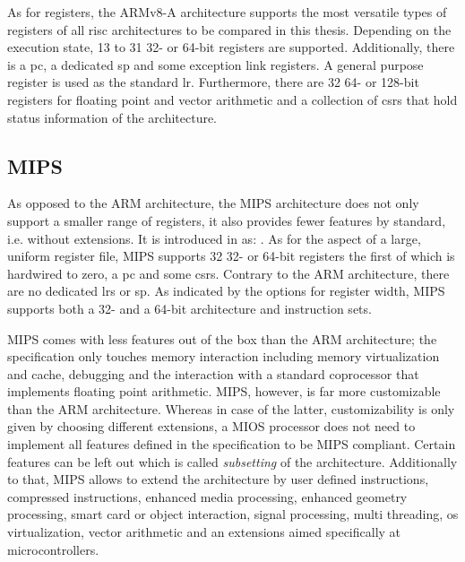 As for registers, the ARMv8-A architecture supports the most versatile types of registers of all \gls{risc} architectures to be compared in this thesis.
Depending on the execution state, 13 to 31 32- or 64-bit registers are supported.
Additionally, there is a \gls{pc}, a dedicated \gls{sp} and some exception link registers.
A general purpose register is used as the standard \gls{lr}.
Furthermore, there are 32 64- or 128-bit registers for floating point and vector arithmetic and a collection of \glspl{csr} that hold status information of the architecture.

\subsection{MIPS}

As opposed to the ARM architecture, the MIPS architecture does not only support a smaller range of registers, it also provides fewer features by standard, i.e. without extensions.
It is introduced in  \cite{MIPS} as: .
As for the aspect of a large, uniform register file, MIPS supports 32 32- or 64-bit registers the first of which is hardwired to zero, a \gls{pc} and some \glspl{csr}.
Contrary to the ARM architecture, there are no dedicated \glspl{lr} or \gls{sp}.
As indicated by the options for register width, MIPS supports both a 32- and a 64-bit architecture and instruction sets.

MIPS comes with less features out of the box than the ARM architecture; the specification only touches memory interaction including memory virtualization and cache, debugging and the interaction with a standard coprocessor that implements floating point arithmetic.
MIPS, however, is far more customizable than the ARM architecture.
Whereas in case of the latter, customizability is only given by choosing different extensions, a MIOS processor does not need to implement all features defined in the specification to be MIPS compliant.
Certain features can be left out which is called \textit{subsetting} of the architecture.
Additionally to that, MIPS allows to extend the architecture by user defined instructions, compressed instructions, enhanced media processing, enhanced geometry processing, smart card or object interaction, signal processing, multi threading, \gls{os} virtualization, vector arithmetic and an extensions aimed specifically at microcontrollers.

